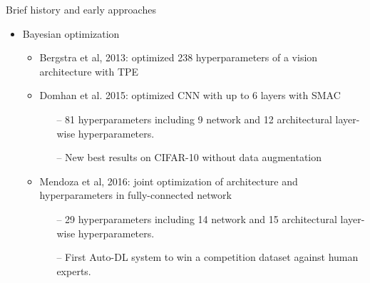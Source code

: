 \begin{frame}[c]{Brief history and early approaches}
\begin{itemize}
	\item Bayesian optimization
	\begin{itemize}
		\item Bergstra et al, 2013: optimized 238 hyperparameters of a vision
		architecture with TPE
		\item Domhan et al. 2015: optimized CNN with up to 6 layers with SMAC
		\begin{itemize}
			\item[--] \alert{81 hyperparameters} including 9 network 
			and 12 architectural layer-wise hyperparameters. 
			\item[--] New best results on CIFAR-10 without data augmentation
		\end{itemize}
		\item Mendoza et al, 2016: joint optimization of architecture and
		hyperparameters in fully-connected network
		\begin{itemize}
			\item[--] \alert{29 hyperparameters} including 14 network and 15 
			architectural layer-wise hyperparameters.
			\item[--] First Auto-DL system to win a competition dataset against 
			human experts.
		\end{itemize}
	\end{itemize}
\end{itemize}
\end{frame}
